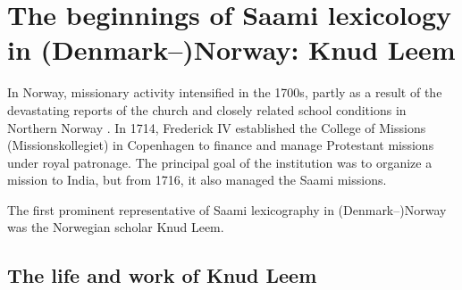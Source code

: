 \documentclass[output=paper,colorlinks,citecolor=brown,arabicfont,chinesefont]{langscibook}
\begin{document}
\section{The beginnings of Saami lexicology in (Denmark–)Norway: Knud Leem}

In Norway, missionary activity intensified in the 1700s, partly as a result of the devastating reports of the church and closely related school conditions in Northern Norway \citep[26--27]{Kjolaas1995}. In 1714,  Frederick IV established the College of Missions (Missionskollegiet) in Copenhagen to finance and manage Protestant missions under royal patronage. The principal goal of the institution was to organize a mission to India, but from 1716, it also managed the Saami missions.

The first prominent representative of Saami lexicography in (Denmark–)Nor\-way was the Norwegian scholar Knud Leem.

\subsection{The life and work of Knud Leem}
\end{document}
